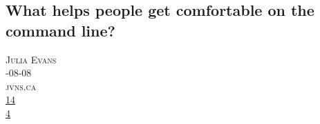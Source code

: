 \documentclass[10pt,a4paper]{article}
\begin{document}
\subsection{What helps people get comfortable on the command line?}
\noindent\begin{minipage}[t]{0.20\linewidth}
\vspace{0pt}
\noindent\textsc{\footnotesize
{\scriptsize\faUser}\space 
Julia Evans \\
{\scriptsize\faCalendar}-08-08 \\
{\scriptsize\faGlobe}\space 
jvns.ca \\
{\scriptsize\faThumbsOUp}\space 
\href{http://news.ycombinator.com/item?id=37174504\&utm\_term=comment}{14} \\
{\scriptsize\faComments}\space 
\href{http://news.ycombinator.com/item?id=37174504\&utm\_term=comment}{4} \\
}
\end{minipage} 
\end{document}
